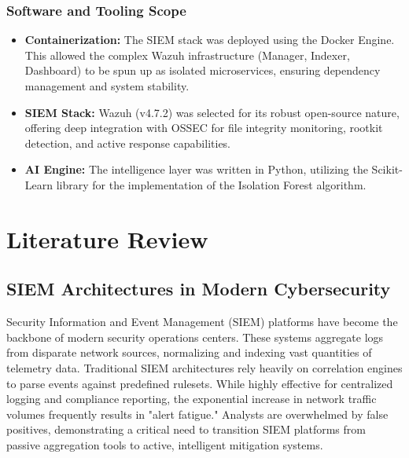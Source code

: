 \documentclass[12pt, a4paper]{report}
\begin{document}
	\subsection{Software and Tooling Scope}
	\begin{itemize}
		\item \textbf{Containerization:} The SIEM stack was deployed using the Docker Engine. This allowed the complex Wazuh infrastructure (Manager, Indexer, Dashboard) to be spun up as isolated microservices, ensuring dependency management and system stability.
		\item \textbf{SIEM Stack:} Wazuh (v4.7.2) was selected for its robust open-source nature, offering deep integration with OSSEC for file integrity monitoring, rootkit detection, and active response capabilities.
		\item \textbf{AI Engine:} The intelligence layer was written in Python, utilizing the Scikit-Learn library for the implementation of the Isolation Forest algorithm.
	\end{itemize}
	
	\chapter{Literature Review}
	\onehalfspacing
	
	\section*{SIEM Architectures in Modern Cybersecurity}
	Security Information and Event Management (SIEM) platforms have become the backbone of modern security operations centers. These systems aggregate logs from disparate network sources, normalizing and indexing vast quantities of telemetry data. Traditional SIEM architectures rely heavily on correlation engines to parse events against predefined rulesets. While highly effective for centralized logging and compliance reporting, the exponential increase in network traffic volumes frequently results in "alert fatigue." Analysts are overwhelmed by false positives, demonstrating a critical need to transition SIEM platforms from passive aggregation tools to active, intelligent mitigation systems.
	
\end{document}
